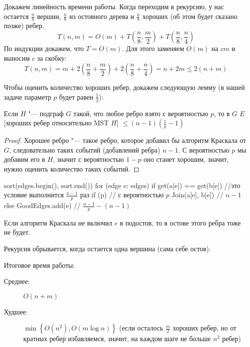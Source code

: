 Докажем линейность времени работы.
Когда переходим в рекурсию, у нас остается $\frac{n}{8}$ вершин, $\frac{n}{8}$ из остовного дерева
и $\frac{n}{8}$ хороших (об этом будет сказано позже) ребер.
\[ T(n, m) = O(m) + T\left(\frac{n}{8}, \frac{m}{2}\right) + T\left(\frac{n}{8}, \frac{n}{4}\right) \]
По индукции докажем, что $T = O(m)$. Для этого заменяем $O(m)$ на $cm$ и выносим $c$ за скобку:
\[ T(n, m) = m + 2\left(\frac{n}{8} + \frac{m}{2}\right) + 2\left(\frac{n}{8} + \frac{n}{4}\right) = n + 2m \le 2(n + m) \]

Чтобы оценить количество хороших ребер, докажем следующую лемму (в нашей задаче параметр $p$ будет равен  $\frac{1}{2}$):

\begin{lemma}
	Если $H$ "--- подграф $G$ такой, что любое ребро взято с вероятностью $p$, то в $G$
	$E$[хороших ребер относительно 	{MST} $H$] $\le (n - 1)(\frac{1}{p} - 1)$
\end{lemma}
\begin{proof}
	Хорошее ребро "--- такое ребро, которое добавил бы алгоритм Краскала от $G$, следовательно таких событий (добавлений ребра) $n - 1$.
	С вероятностью $p$ мы добавим его в $H$, значит с вероятностью $1 - p$ оно станет хорошим, значит, нужно оценить количество таких событий.
\end{proof}

\begin{cppcode}
sort(edges.begin(), sort.end())
for (edge e: edges) {
	if get(a[e]) == get(b[e]) //это условие выполнится $\frac{n - 1}{p}$ раз
		if (p) // с вероятностью $p$
			Join(a[e], b[e]) // $n - 1$
		else
			GoodEdges.add(e) // $\frac{n - 1}{p} - (n - 1)$
}
\end{cppcode}

\begin{Rem}
	Если алгоритм Краскала не включил $e$ в подостов, то в остове этого ребра тоже не будет.
\end{Rem}
\begin{Rem}
	Рекурсия обрывается, когда остается одна вершина (сама себе остов).
\end{Rem}

Итоговое время работы:
\begin{description}
\item[Среднее:]
	$O(n + m)$

\item[Худшее:]
	$\min\left\{O\left(n^2\right), O(m \log n)\right\}$
	(если осталось $\frac{m}{2}$ хороших ребер, но от кратных ребер избавляемся, значит, на каждом шаге не больше $n^2$ ребер)
\end{description}


